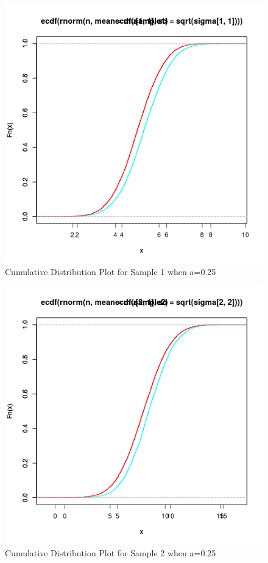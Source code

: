 \documentclass{article}
\begin{document}
  			\begin{figure}[!ht]
  			\includegraphics[width=\linewidth]{pic/cdf_sample1_3.png}
 			 \caption{Cumulative Distribution Plot for Sample 1 when a=0.25}
  			\label{fig:hist1_1}
  			\end{figure}
  			
  			\begin{figure}[!ht]
  			\includegraphics[width=\linewidth]{pic/cdf_sample2_3.png}
 			 \caption{Cumulative Distribution Plot for Sample 2 when a=0.25}
  			\label{fig:hist1_1}
  			\end{figure}
  			
\end{document}
